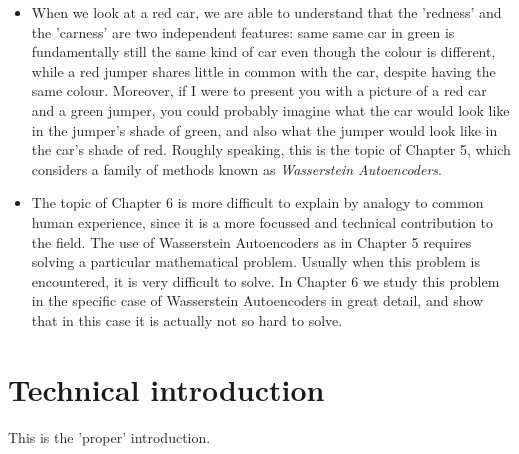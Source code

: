 \begin{itemize}
\item When we look at a red car, we are able to understand that the 'redness' and the 'carness' are two independent features: same same car in green is fundamentally still the same kind of car even though the colour is different, while a red jumper shares little in common with the car, despite having the same colour. Moreover, if I were to present you with a picture of a red car and a green jumper, you could probably imagine what the car would look like in the jumper's shade of green, and also what the jumper would look like in the car's shade of red. Roughly speaking, this is the topic of Chapter 5, which considers a family of methods known as \emph{Wasserstein Autoencoders}.
\item The topic of Chapter 6 is more difficult to explain by analogy to common human experience, since it is a more focussed and technical contribution to the field. The use of Wasserstein Autoencoders as in Chapter 5 requires solving a particular mathematical problem. Usually when this problem is encountered, it is very difficult to solve. In Chapter 6 we study this problem in the specific case of Wasserstein Autoencoders in great detail, and show that in this case it is actually not so hard to solve. 
\end{itemize}


\section{Technical introduction}

This is the 'proper' introduction.

